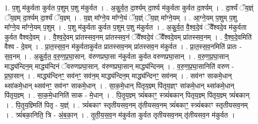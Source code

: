 \documentclass[17pt]{extarticle}
\begin{document}
1. प॒शु म॑कुर्वता कुर्वत प॒शुम् प॒शु म॑कुर्वत । . अ॒कु॒र्व॒त॒ दा॒र्श्यम् दा॒र्श्य म॑कुर्वता कुर्वत दा॒र्श्यम् । . दा॒र्श्यं ॅय॒ज्ञ्ं ॅय॒ज्ञ्म् दा॒र्श्यम् दा॒र्श्यं ॅय॒ज्ञ्म् । . य॒ज्ञ् मा᳚ग्ने॒य मा᳚ग्ने॒यं ॅय॒ज्ञ्ं ॅय॒ज्ञ् मा᳚ग्ने॒यम् । . आ॒ग्ने॒यम् प॒शुम् प॒शु मा᳚ग्ने॒य मा᳚ग्ने॒यम् प॒शुम् । . प॒शु म॑कुर्वता कुर्वत प॒शुम् प॒शु म॑कुर्वत । . अ॒कु॒र्व॒त॒ वै॒श्व॒दे॒वं ॅवै᳚श्वदे॒व म॑कुर्वता कुर्वत वैश्वदे॒वम् । . वै॒श्व॒दे॒वम् प्रा॑तस्सव॒नम् प्रा॑तस्सव॒नं ॅवै᳚श्वदे॒वं ॅवै᳚श्वदे॒वम् प्रा॑तस्सव॒नम् । . वै॒श्व॒दे॒वमिति॑ वैश्व - दे॒वम् । . प्रा॒त॒स्स॒व॒न म॑कुर्वताकुर्वत प्रातस्सव॒नम् प्रा॑तस्सव॒न म॑कुर्वत । . प्रा॒त॒स्स॒व॒नमिति॑ प्रातः - स॒व॒नम् । . अ॒कु॒र्व॒त॒ व॒रु॒ण॒प्र॒घा॒सान्. व॑रुणप्रघा॒सा न॑कुर्वता कुर्वत वरुणप्रघा॒सान् । . व॒रु॒ण॒प्र॒घा॒सान् माद्ध्य॑न्दिन॒म् माद्ध्य॑न्दिनं ॅवरुणप्रघा॒सान्. व॑रुणप्रघा॒सान् माद्ध्य॑न्दिनम् । . व॒रु॒ण॒प्र॒घा॒सानिति॑ वरुण - प्र॒घा॒सान् । . माद्ध्य॑न्दिनꣳ॒॒ सव॑नꣳ॒॒ सव॑न॒म् माद्ध्य॑न्दिन॒म् माद्ध्य॑न्दिनꣳ॒॒ सव॑नम् । . सव॑नꣳ साकमे॒धान् थ्सा॑कमे॒धान् थ्सव॑नꣳ॒॒ सव॑नꣳ साकमे॒धान् । . सा॒क॒मे॒धान् पि॑तृय॒ज्ञ्म् पि॑तृय॒ज्ञ्ꣳ सा॑कमे॒धान् थ्सा॑कमे॒धान् पि॑तृय॒ज्ञ्म् । . सा॒क॒मे॒धानिति॑ साक - मे॒धान् । . पि॒तृ॒य॒ज्ञ्म् त्र्यं॑बकाꣳ॒॒ स्त्र्यं॑बकान् पितृय॒ज्ञ्म् पि॑तृय॒ज्ञ्म् त्र्यं॑बकान् । . पि॒तृ॒य॒ज्ञ्मिति॑ पितृ - य॒ज्ञ्ं । . त्र्यं॑बकाꣳ स्तृतीयसव॒नम् तृ॑तीयसव॒नम् त्र्यं॑बकाꣳ॒॒ स्त्र्यं॑बकाꣳ स्तृतीयसव॒नम् । . त्र्यं॑बका॒निति॒ त्रि - अं॒ब॒का॒न् । . तृ॒ती॒य॒स॒व॒न म॑कुर्वता कुर्वत तृतीयसव॒नम् तृ॑तीयसव॒न म॑कुर्वत । \newline
\end{document}
